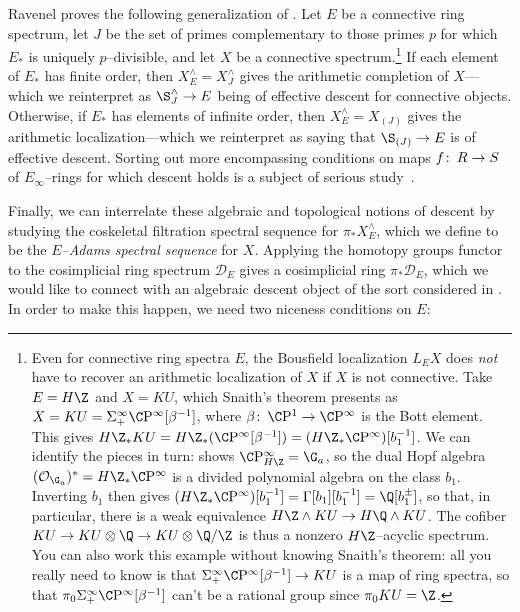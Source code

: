 \begin{remark}
Ravenel proves the following generalization of .  Let $E$ be a connective ring spectrum, let $J$ be the set of primes complementary to those primes $p$ for which $E_*$ is uniquely $p$--divisible, and let $X$ be a connective spectrum.\footnote{Even for connective ring spectra $E$, the Bousfield localization $L_E X$ does \emph{not} have to recover an arithmetic localization of $X$ if $X$ is not connective.  Take $E = H\Z$ and $X = KU$, which Snaith's theorem presents as $X = KU = \Susp^\infty_+ \CP^\infty[\beta^{-1}]$, where $\beta\co \CP^1 \to \CP^\infty$ is the Bott element.  This gives $H\Z_* KU = H\Z_*(\CP^\infty[\beta^{-1}]) = (H\Z_* \CP^\infty)[b_1^{-1}]$.  We can identify the pieces in turn:  shows $\CP^\infty_{H\Z} = \G_a$, so the dual Hopf algebra $(\sheaf O_{\G_a})^* = H\Z_* \CP^\infty$ is a divided polynomial algebra on the class $b_1$.  Inverting $b_1$ then gives $(H\Z_* \CP^\infty)[b_1^{-1}] = \Gamma[b_1][b_1^{-1}] = \Q[b_1^\pm]$, so that, in particular, there is a weak equivalence $H\Z \sm KU \to H\Q \sm KU$.  The cofiber $KU \to KU \otimes \Q \to KU \otimes \Q/\Z$ is thus a nonzero $H\Z$--acyclic spectrum.  You can also work this example without knowing Snaith's theorem: all you really need to know is that $\Susp^\infty_+ \CP^\infty[\beta^{-1}] \to KU$ is a map of ring spectra, so that $\pi_0 \Susp^\infty_+ \CP^\infty[\beta^{-1}]$ can't be a rational group since $\pi_0 KU = \Z$.}  If each element of $E_*$ has finite order, then $X^\wedge_E = X^\wedge_J$ gives the arithmetic completion of $X$---which we reinterpret as $\S^\wedge_J \to E$ being of effective descent for connective objects.  Otherwise, if $E_*$ has elements of infinite order, then $X^\wedge_E = X_{(J)}$ gives the arithmetic localization---which we reinterpret as saying that $\S_{(J)} \to E$ is of effective descent.  Sorting out more encompassing conditions on maps $f\colon\thinspace R \to S$ of $E_\infty$--rings for which descent holds is a subject of serious study~\cite[Appendix D]{LurieSAG}.
\end{remark}

Finally, we can interrelate these algebraic and topological notions of descent by studying the coskeletal filtration spectral sequence for $\pi_* X^\wedge_E$, which we define to be the \textit{$E$--Adams spectral sequence} for $X$.  Applying the homotopy groups functor to the cosimplicial ring spectrum $\mathcal D_E$ gives a cosimplicial ring $\pi_* \mathcal D_E$, which we would like to connect with an algebraic descent object of the sort considered in .  In order to make this happen, we need two niceness conditions on $E$:

